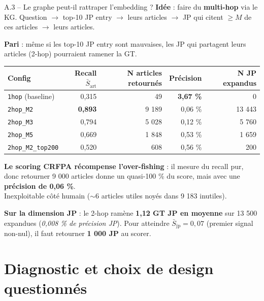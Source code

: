 \documentclass[aspectratio=169,10pt]{beamer}
\newcommand{\warnbox}[1]{%
  \begin{center}
  \colorbox{red!10}{\parbox{0.92\linewidth}{\centering #1}}
  \end{center}}
\begin{document}
\begin{frame}{A.3 -- Le graphe peut-il rattraper l'embedding ?}
  \footnotesize
  \textbf{Idée} : faire du \textbf{multi-hop} via le KG. Question $\to$ top-10 JP entry $\to$ leurs articles $\to$ JP qui citent $\geq M$ de ces articles $\to$ leurs articles.

  \vspace{0.3em}
  \textbf{Pari} : même si les top-10 JP entry sont mauvaises, les JP qui partagent leurs articles (2-hop) pourraient ramener la GT.

  \vspace{0.4em}
  \renewcommand{\arraystretch}{1.2}
  \begin{tabular}{@{}l r r r r@{}}
    \toprule
    \textbf{Config} & \textbf{Recall $\bar{S}_{\text{art}}$} & \textbf{N articles retournés} & \textbf{Précision} & \textbf{N JP expandus} \\
    \midrule
    \texttt{1hop} (baseline)    & 0,315 & 49 & \textbf{3,67 \%} & 0 \\
    \texttt{2hop\_M2}           & \textbf{0,893} & 9 189 & 0,06 \% & 13 443 \\
    \texttt{2hop\_M3}           & 0,794 & 5 028 & 0,12 \% & 5 760 \\
    \texttt{2hop\_M5}           & 0,669 & 1 848 & 0,53 \% & 1 659 \\
    \texttt{2hop\_M2\_top200}   & 0,520 & 608   & 0,56 \% & 200 \\
    \bottomrule
  \end{tabular}

  \vspace{0.5em}
  \warnbox{\textbf{Le scoring CRFPA récompense l'over-fishing} : il mesure du recall pur, donc retourner 9 000 articles donne un quasi-100 \% du score, mais avec une \textbf{précision de 0,06 \%}. \\Inexploitable côté humain ($\sim$6 articles utiles noyés dans 9 183 inutiles).}

  \vspace{0.4em}
  \textbf{Sur la dimension JP} : le 2-hop ramène \textbf{1,12 GT JP en moyenne} sur 13 500 expandues (\textit{0,008 \% de précision JP}). Pour atteindre \(\bar{S}_{\text{jp}} = 0{,}07\) (premier signal non-nul), il faut retourner \textbf{1 000 JP} au scorer.
\end{frame}

\section{Diagnostic et choix de design questionnés}
\end{document}
